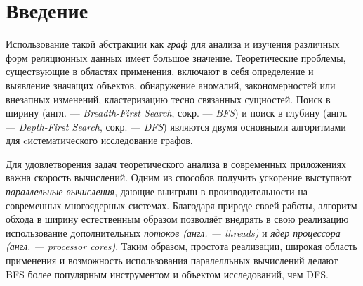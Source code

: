 
\section*{Введение}
\label{sec:intro}
Использование такой абстракции как \textit{граф} для анализа и изучения различных форм реляционных данных имеет большое значение. Теоретические проблемы, существующие в областях применения, включают в себя определение и выявление значащих объектов, обнаружение аномалий, закономерностей или внезапных изменений, кластеризацию тесно связанных сущностей. Поиск в ширину (англ. --- \textit{Breadth-First Search}, сокр. --- \textit{BFS}) и поиск в глубину (англ. --- \textit{Depth-First Search}, сокр. --- \textit{DFS}) являются двумя основными алгоритмами для cистематического исследование графов. 

Для удовлетворения задач теоретического анализа в современных приложениях важна скорость вычислений. Одним из способов получить ускорение выступают \textit{параллельные вычисления}, дающие выигрыш в производительности на современных многоядерных системах. Благодаря природе своей работы, алгоритм обхода в ширину естественным образом позволяёт внедрять в свою реализацию использование дополнительных \textit{потоков (англ. --- threads)} и \textit{ядер процессора (англ. --- processor cores)}. Таким образом, простота реализации, широкая область применения и возможность использования паралелльных вычислений делают BFS более популярным инструментом и объектом исследований, чем DFS.
